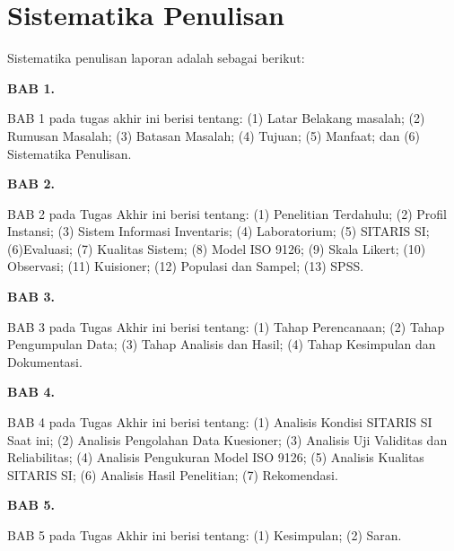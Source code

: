 \section{Sistematika Penulisan}
Sistematika penulisan laporan adalah sebagai berikut:

\textbf{BAB 1. \babSatu}

BAB 1 pada tugas akhir ini berisi tentang: (1) Latar Belakang masalah; (2) Rumusan Masalah; (3) Batasan Masalah; (4) Tujuan; (5) Manfaat; dan (6) Sistematika Penulisan.

\textbf{BAB 2. \babDua}

BAB 2 pada Tugas Akhir ini berisi tentang: (1) Penelitian Terdahulu; (2) Profil Instansi; (3) Sistem Informasi Inventaris; (4) Laboratorium; (5) SITARIS SI; (6)Evaluasi; (7) Kualitas Sistem; (8) Model ISO 9126; (9) Skala Likert; (10) Observasi; (11) Kuisioner; (12) Populasi dan Sampel; (13) SPSS.


\textbf{BAB 3. \babTiga}

BAB 3 pada Tugas Akhir ini berisi tentang: (1) Tahap Perencanaan; (2)
Tahap Pengumpulan Data; (3) Tahap Analisis dan Hasil; (4) Tahap Kesimpulan dan Dokumentasi.


\textbf{BAB 4. \babEmpat}

BAB 4 pada Tugas Akhir ini berisi tentang: (1) Analisis Kondisi SITARIS SI Saat ini; (2) Analisis Pengolahan Data Kuesioner; (3) Analisis Uji Validitas dan Reliabilitas; (4) Analisis Pengukuran Model ISO 9126; (5) Analisis Kualitas SITARIS SI; (6) Analisis Hasil Penelitian; (7) Rekomendasi.

\textbf{BAB 5. \babLima}

BAB 5 pada Tugas Akhir ini berisi tentang: (1) Kesimpulan; (2) Saran.